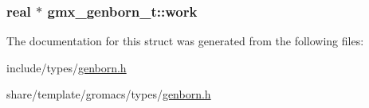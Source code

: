 \hypertarget{structgmx__genborn__t_a5400ef71b3a74c780f5ac8676f2eb2a2}{
\subsubsection[{work}]{\setlength{\rightskip}{0pt plus 5cm}real $\ast$ {\bf gmx\-\_\-genborn\-\_\-t\-::work}}}\label{structgmx__genborn__t_a5400ef71b3a74c780f5ac8676f2eb2a2}


\-The documentation for this struct was generated from the following files\-:\begin{DoxyCompactItemize}
\item 
include/types/\hyperlink{include_2types_2genborn_8h}{genborn.\-h}\item 
share/template/gromacs/types/\hyperlink{share_2template_2gromacs_2types_2genborn_8h}{genborn.\-h}\end{DoxyCompactItemize}
